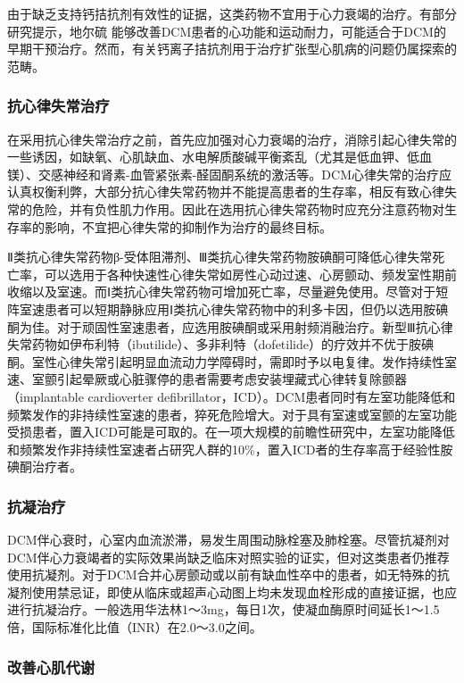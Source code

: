 由于缺乏支持钙拮抗剂有效性的证据，这类药物不宜用于心力衰竭的治疗。有部分研究提示，地尔硫{}
能够改善DCM患者的心功能和运动耐力，可能适合于DCM的早期干预治疗。然而，有关钙离子拮抗剂用于治疗扩张型心肌病的问题仍属探索的范畴。

\subsubsection{抗心律失常治疗}

在采用抗心律失常治疗之前，首先应加强对心力衰竭的治疗，消除引起心律失常的一些诱因，如缺氧、心肌缺血、水电解质酸碱平衡紊乱（尤其是低血钾、低血镁）、交感神经和肾素-血管紧张素-醛固酮系统的激活等。DCM心律失常的治疗应认真权衡利弊，大部分抗心律失常药物并不能提高患者的生存率，相反有致心律失常的危险，并有负性肌力作用。因此在选用抗心律失常药物时应充分注意药物对生存率的影响，不宜把心律失常的抑制作为治疗的最终目标。

Ⅱ类抗心律失常药物β-受体阻滞剂、Ⅲ类抗心律失常药物胺碘酮可降低心律失常死亡率，可以选用于各种快速性心律失常如房性心动过速、心房颤动、频发室性期前收缩以及室速。而Ⅰ类抗心律失常药物可增加死亡率，尽量避免使用。尽管对于短阵室速患者可以短期静脉应用Ⅰ类抗心律失常药物中的利多卡因，但仍以选用胺碘酮为佳。对于顽固性室速患者，应选用胺碘酮或采用射频消融治疗。新型Ⅲ抗心律失常药物如伊布利特（ibutilide）、多非利特（dofetilide）的疗效并不优于胺碘酮。室性心律失常引起明显血流动力学障碍时，需即时予以电复律。发作持续性室速、室颤引起晕厥或心脏骤停的患者需要考虑安装埋藏式心律转复除颤器（implantable
cardioverter
defibrillator，ICD）。DCM患者同时有左室功能降低和频繁发作的非持续性室速的患者，猝死危险增大。对于具有室速或室颤的左室功能受损患者，置入ICD可能是可取的。在一项大规模的前瞻性研究中，左室功能降低和频繁发作非持续性室速者占研究人群的10\%，置入ICD者的生存率高于经验性胺碘酮治疗者。

\subsubsection{抗凝治疗}

DCM伴心衰时，心室内血流淤滞，易发生周围动脉栓塞及肺栓塞。尽管抗凝剂对DCM伴心力衰竭者的实际效果尚缺乏临床对照实验的证实，但对这类患者仍推荐使用抗凝剂。对于DCM合并心房颤动或以前有缺血性卒中的患者，如无特殊的抗凝剂使用禁忌证，即使从临床或超声心动图上均未发现血栓形成的直接证据，也应进行抗凝治疗。一般选用华法林1～3mg，每日1次，使凝血酶原时间延长1～1.5倍，国际标准化比值（INR）在2.0～3.0之间。

\subsubsection{改善心肌代谢}

